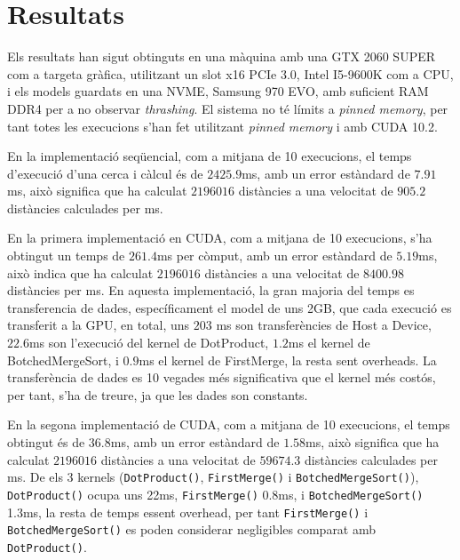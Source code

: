 \documentclass[catalan,10pt,a4paper]{article}
\begin{document}
\section*{Resultats}\label{sec:results}

Els resultats han sigut obtinguts en una màquina amb una GTX 2060 SUPER com a targeta gràfica, utilitzant un slot x16 PCIe 3.0, Intel I5-9600K com a CPU, i els models guardats en una NVME, Samsung 970 EVO, amb suficient RAM DDR4 per a no observar \textit{thrashing}. El sistema no té límits a \textit{pinned memory}, per tant totes les execucions s'han fet utilitzant \textit{pinned memory} i amb CUDA 10.2.


En la implementació seqüencial, com a mitjana de 10 execucions, el temps d'execució d'una cerca i càlcul és de $2425.9$ms, amb un error estàndard de $7.91$ms, això significa que ha calculat $2196016$ distàncies a una velocitat de $905.2$ distàncies calculades per ms. 

En la primera implementació en CUDA, com a mitjana de 10 execucions, s'ha obtingut un temps de $261.4$ms per còmput, amb un error estàndard de $5.19$ms, això indica que ha calculat $2196016$ distàncies a una velocitat de $8400.98$ distàncies per ms. En aquesta implementació, la gran majoria del temps es transferencia de dades, específicament el model de uns 2GB, que cada execució es transferit a la GPU, en total, uns $203$ ms son transferències de Host a Device, $22.6$ms son l'execució del kernel de DotProduct, $1.2$ms el kernel de BotchedMergeSort, i $0.9$ms el kernel de FirstMerge, la resta sent overheads. La transferència de dades es 10 vegades més significativa que el kernel més costós, per tant, s'ha de treure, ja que les dades son constants.


En la segona implementació de CUDA, com a mitjana de 10 execucions, el temps obtingut és de $36.8$ms, amb un error estàndard de $1.58$ms, això significa que ha calculat $2196016$ distàncies a una velocitat de $59674.3$ distàncies calculades per ms. De els 3 kernels (\verb|DotProduct()|, \verb|FirstMerge()| i \verb|BotchedMergeSort()|), \verb|DotProduct()| ocupa uns 22ms, \verb|FirstMerge()| 0.8ms, i \verb|BotchedMergeSort()| 1.3ms, la resta de temps essent overhead, per tant \verb|FirstMerge()| i \verb|BotchedMergeSort()| es poden considerar negligibles comparat amb \verb|DotProduct()|.
\end{document}
